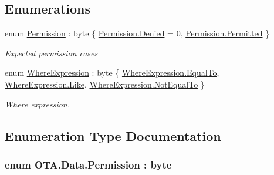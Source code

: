 \subsection*{Enumerations}
\begin{DoxyCompactItemize}
\item 
enum \hyperlink{namespace_o_t_a_1_1_data_acb383d9e681580b5a8710a08fb7c3aef}{Permission} \+: byte \{ \hyperlink{namespace_o_t_a_1_1_data_acb383d9e681580b5a8710a08fb7c3aefa58d036b9b7f0e7eb38cfb90f1cc70a73}{Permission.\+Denied} = 0, 
\hyperlink{namespace_o_t_a_1_1_data_acb383d9e681580b5a8710a08fb7c3aefad383a04a7397ca336d985e7e55d78ad5}{Permission.\+Permitted}
 \}\begin{DoxyCompactList}\small\item\em Expected permission cases \end{DoxyCompactList}
\item 
enum \hyperlink{namespace_o_t_a_1_1_data_ac4493f749a9d22b58e2b46dd0b41b61d}{Where\+Expression} \+: byte \{ \hyperlink{namespace_o_t_a_1_1_data_ac4493f749a9d22b58e2b46dd0b41b61da0242c502bd906e05171e64bad31c7c21}{Where\+Expression.\+Equal\+To}, 
\hyperlink{namespace_o_t_a_1_1_data_ac4493f749a9d22b58e2b46dd0b41b61da98b82c200a2e309b24cb481970f3fcc4}{Where\+Expression.\+Like}, 
\hyperlink{namespace_o_t_a_1_1_data_ac4493f749a9d22b58e2b46dd0b41b61da0961129d84d9d8f6aa4138a3e5022a1d}{Where\+Expression.\+Not\+Equal\+To}
 \}\begin{DoxyCompactList}\small\item\em Where expression. \end{DoxyCompactList}
\end{DoxyCompactItemize}


\subsection{Enumeration Type Documentation}
\hypertarget{namespace_o_t_a_1_1_data_acb383d9e681580b5a8710a08fb7c3aef}{}
\subsubsection[{Permission}]{\setlength{\rightskip}{0pt plus 5cm}enum {\bf O\+T\+A.\+Data.\+Permission} \+: byte\hspace{0.3cm}{\ttfamily [strong]}}\label{namespace_o_t_a_1_1_data_acb383d9e681580b5a8710a08fb7c3aef}


